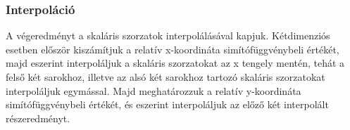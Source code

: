 \documentclass[12pt]{article}
\begin{document}
\subsubsection{Interpoláció}
A végeredményt a skaláris szorzatok interpolálásával kapjuk. Kétdimenziós
esetben először kiszámítjuk a relatív x-koordináta simítófüggvénybeli értékét,
majd eszerint interpoláljuk a skaláris szorzatokat az x tengely mentén, tehát a
felső két sarokhoz, illetve az alsó két sarokhoz tartozó skaláris szorzatokat
interpoláljuk egymással. Majd meghatározzuk a relatív y-koordináta
simítófüggvénybeli értékét, és eszerint interpoláljuk az előző két interpolált
részeredményt.
\begin{algorithm}
    \caption{Interpoláció}
    \DontPrintSemicolon
\end{algorithm}
\newpage
\end{document}
